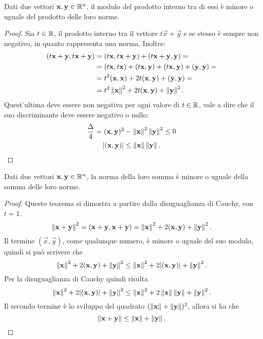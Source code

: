 \begin{teorema}
Dati due vettori $\mathbf{x}, \mathbf{y}\in\mathbb{R}^n$, il modulo del prodotto interno tra di essi è minore o uguale del prodotto delle loro norme.
\end{teorema}
\begin{proof}
Sia $t\in\mathbb{R}$, il prodotto interno tra il vettore $t\vec x+\vec y$ e se stesso è sempre non negativo, in quanto rappresenta una norma. Inoltre:
\begin{align*}
(t\mathbf{x}+\mathbf{y},t\mathbf{x}+\mathbf{y})&=(t\mathbf{x},t\mathbf{x}+\mathbf{y})+(t\mathbf{x}+\mathbf{y},\mathbf{y})=\\
&=(t\mathbf{x},t\mathbf{x})+(t\mathbf{x},\mathbf{y})+(t\mathbf{x},\mathbf{y})+(\mathbf{y},\mathbf{y})=\\
&=t^2(\mathbf{x},\mathbf{x})+2t(\mathbf{x},\mathbf{y})+(\mathbf{y},\mathbf{y})=\\
&=t^2\left\|{\mathbf{x}}\right\|^2+2t(\mathbf{x},\mathbf{y})+\left\|{\mathbf{y}}\right\|^2.
\end{align*}
Quest'ultima deve essere non negativa per ogni valore di $t\in\mathbb{R}$, vale a dire che il suo discriminante deve essere negativo o nullo:
\begin{gather*}
\frac{\Delta}{4}=(\mathbf{x},\mathbf{y})^2-\left\|{\mathbf{x}}\right\|^2\left\|{\mathbf{y}}\right\|^2\leq 0\\
|(\mathbf{x},\mathbf{y})|\leq\left\|{\mathbf{x}}\right\|\left\|{\mathbf{y}}\right\|.\qedhere
\end{gather*}
\end{proof}
\begin{teorema}
Dati due vettori $\mathbf{x}, \mathbf{y}\in\mathbb{R}^n$, la norma della loro somma è minore o uguale della somma delle loro norme.
\end{teorema}
\begin{proof}
Questo teorema si dimostra a partire dalla disuguaglianza di Cauchy, con $t=1$.
\[
\left\|{\mathbf{x}+\mathbf{y}}\right\|^2=(\mathbf{x}+\mathbf{y},\mathbf{x}+\mathbf{y})=\left\|{\mathbf{x}}\right\|^2+2(\mathbf{x},\mathbf{y})+\left\|{\mathbf{y}}\right\|^2.
\]
Il termine $(\vec x,\vec y)$, come qualunque numero, è minore o uguale del suo modulo, quindi si può scrivere che
\[
\left\|{\mathbf{x}}\right\|^2+2(\mathbf{x},\mathbf{y})+\left\|{\mathbf{y}}\right\|^2\leq\left\|{\mathbf{x}}\right\|^2+2|(\mathbf{x},\mathbf{y})|+\left\|{\mathbf{y}}\right\|^2.
\]
Per la disuguaglianza di Cauchy quindi risulta
\[
\left\|{\mathbf{x}}\right\|^2+2|(\mathbf{x},\mathbf{y})|+\left\|{\mathbf{y}}\right\|^2\leq\left\|{\mathbf{x}}\right\|^2+2\left\|{\mathbf{x}}\right\|\left\|{\mathbf{y}}\right\|+\left\|{\mathbf{y}}\right\|^2.
\]
Il secondo termine è lo sviluppo del quadrato $(\left\|{\mathbf{x}}\right\|+\left\|{\mathbf{y}}\right\|)^2$, allora si ha che
\[
\left\|{\mathbf{x}+\mathbf{y}}\right\|\leq\left\|{\mathbf{x}}\right\|+\left\|{\mathbf{y}}\right\|.\qedhere
\]
\end{proof}

